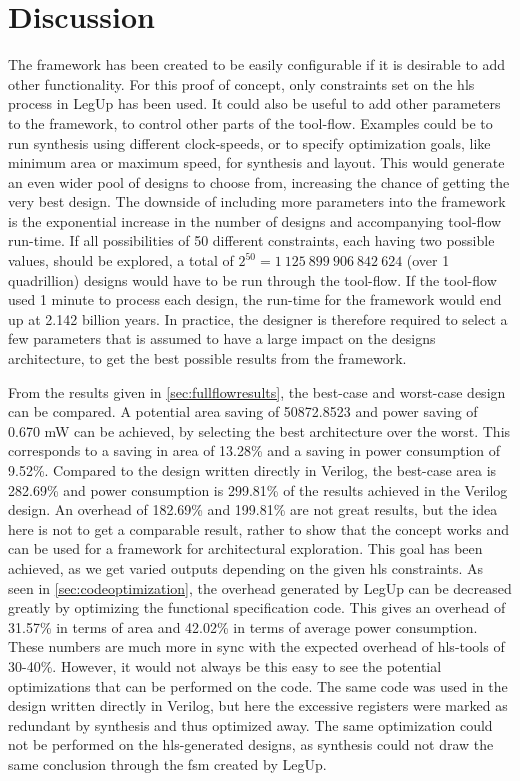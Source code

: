 \chapter{\label{chp:discussion}Discussion}

The framework has been created to be easily configurable if it is desirable to add other functionality. For this proof of concept, only constraints set on the \gls{hls} process in LegUp has been used. It could also be useful to add other parameters to the framework, to control other parts of the tool-flow. Examples could be to run synthesis using different clock-speeds, or to specify optimization goals, like minimum area or maximum speed, for synthesis and layout. This would generate an even wider pool of designs to choose from, increasing the chance of getting the very best design. The downside of including more parameters into the framework is the exponential increase in the number of designs and accompanying tool-flow run-time. If all possibilities of 50 different constraints, each having two possible values, should be explored, a total of $2^{50} = 1~125~899~906~842~624$ (over 1 quadrillion) designs would have to be run through the tool-flow. If the tool-flow used 1 minute to process each design, the run-time for the framework would end up at 2.142 billion years. In practice, the designer is therefore required to select a few parameters that is assumed to have a large impact on the designs architecture, to get the best possible results from the framework.

From the results given in \cref{sec:fullflowresults}, the best-case and worst-case design can be compared. A potential area saving of 50872.8523 and power saving of 0.670 mW can be achieved, by selecting the best architecture over the worst. This corresponds to a saving in area of 13.28\% and a saving in power consumption of 9.52\%. Compared to the design written directly in Verilog, the best-case area is 282.69\% and power consumption is 299.81\% of the results achieved in the Verilog design. An overhead of 182.69\% and 199.81\% are not great results, but the idea here is not to get a comparable result, rather to show that the concept works and can be used for a framework for architectural exploration. This goal has been achieved, as we get varied outputs depending on the given \gls{hls} constraints. As seen in \cref{sec:codeoptimization}, the overhead generated by LegUp can be decreased greatly by optimizing the functional specification code. This gives an overhead of 31.57\% in terms of area and 42.02\% in terms of average power consumption. These numbers are much more in sync with the expected overhead of \gls{hls}-tools of 30-40\%. However, it would not always be this easy to see the potential optimizations that can be performed on the code. The same code was used in the design written directly in Verilog, but here the excessive registers were marked as redundant by synthesis and thus optimized away. The same optimization could not be performed on the \gls{hls}-generated designs, as synthesis could not draw the same conclusion through the \gls{fsm} created by LegUp.

